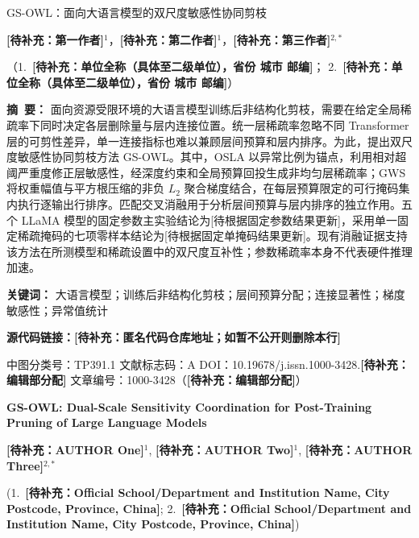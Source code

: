 \documentclass[UTF8,fontset=fandol]{ctexart}
\newcommand{\method}{GS-OWL}
\newcommand{\placeholder}[1]{\textbf{[待补充：#1]}}
\begin{document}

\begingroup
\setlength{\parindent}{0pt}
\begin{center}
{\heiti{} GS-OWL：面向大语言模型的双尺度敏感性协同剪枝\par}
\vspace{7pt}
{ \placeholder{第一作者}$^{1}$，\placeholder{第二作者}$^{1}$，\placeholder{第三作者}$^{2,*}$\par}
\vspace{4pt}
{
（1.\ \placeholder{单位全称（具体至二级单位），省份 城市 邮编}；
2.\ \placeholder{单位全称（具体至二级单位），省份 城市 邮编}）\par}
\end{center}

\vspace{5pt}
\noindent\textbf{摘\ 要：}
面向资源受限环境的大语言模型训练后非结构化剪枝，需要在给定全局稀疏率下同时决定各层删除量与层内连接位置。统一层稀疏率忽略不同 Transformer 层的可剪性差异，单一连接指标也难以兼顾层间预算和层内排序。为此，提出双尺度敏感性协同剪枝方法 \method。其中，OSLA 以异常比例为锚点，利用相对超阈严重度修正层敏感性，经深度约束和全局预算回投生成非均匀层稀疏率；GWS 将权重幅值与平方根压缩的非负 $L_2$ 聚合梯度结合，在每层预算限定的可行掩码集内执行逐输出行排序。匹配交叉消融用于分析层间预算与层内排序的独立作用。五个 LLaMA 模型的固定参数主实验结论为[待根据固定参数结果更新]，采用单一固定稀疏掩码的七项零样本结论为[待根据固定单掩码结果更新]。现有消融证据支持该方法在所测模型和稀疏设置中的双尺度互补性；参数稀疏率本身不代表硬件推理加速。

\noindent\textbf{关键词：}
大语言模型；训练后非结构化剪枝；层间预算分配；连接显著性；梯度敏感性；异常值统计

\noindent\textbf{源代码链接：}\placeholder{匿名代码仓库地址；如暂不公开则删除本行}

\noindent 中图分类号：TP391.1 \qquad 文献标志码：A \qquad
DOI：10.19678/j.issn.1000-3428.\placeholder{编辑部分配} \qquad
文章编号：1000-3428（\placeholder{编辑部分配}）

\vspace{8pt}
\begin{center}
{\bfseries{} GS-OWL: Dual-Scale Sensitivity Coordination for Post-Training Pruning of Large Language Models\par}
\vspace{5pt}
{ \placeholder{AUTHOR One}$^{1}$, \placeholder{AUTHOR Two}$^{1}$, \placeholder{AUTHOR Three}$^{2,*}$\par}
\vspace{3pt}
{
(1.\ \placeholder{Official School/Department and Institution Name, City Postcode, Province, China};
2.\ \placeholder{Official School/Department and Institution Name, City Postcode, Province, China})\par}
\end{center}
\end{document}
